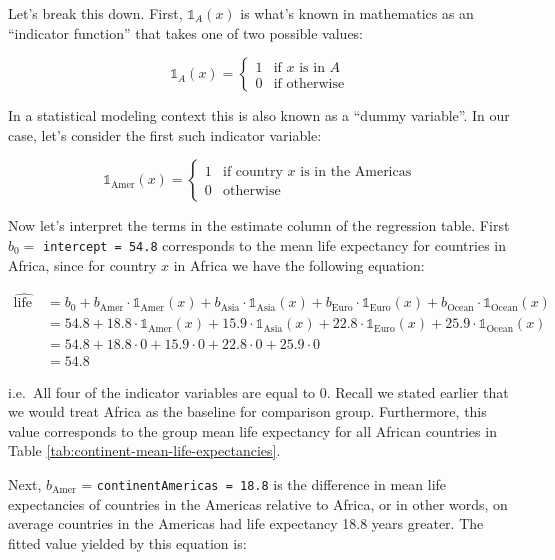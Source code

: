 \documentclass[12pt,]{krantz}
\theoremstyle{definition}
\theoremstyle{definition}
\theoremstyle{definition}
\theoremstyle{remark}
\begin{document}
Let's break this down. First, \(\mathbb{1}_{A}(x)\) is what's known in
mathematics as an ``indicator function'' that takes one of two possible
values:

\[
\mathbb{1}_{A}(x) = \left\{
\begin{array}{ll}
1 & \text{if } x \text{ is in } A \\
0 & \text{if } \text{otherwise} \end{array}
\right.
\]

In a statistical modeling context this is also known as a ``dummy
variable''. In our case, let's consider the first such indicator
variable:

\[
\mathbb{1}_{\mbox{Amer}}(x) = \left\{
\begin{array}{ll}
1 & \text{if } \text{country } x \text{ is in the Americas} \\
0 & \text{otherwise}\end{array}
\right.
\]

Now let's interpret the terms in the estimate column of the regression
table. First \(b_0 =\) \texttt{intercept\ =\ 54.8} corresponds to the
mean life expectancy for countries in Africa, since for country \(x\) in
Africa we have the following equation:

\begin{align}
\widehat{\text{life exp}} &= b_0 + b_{\text{Amer}}\cdot\mathbb{1}_{\mbox{Amer}}(x) + b_{\text{Asia}}\cdot\mathbb{1}_{\mbox{Asia}}(x)
+ b_{\text{Euro}}\cdot\mathbb{1}_{\mbox{Euro}}(x) + b_{\text{Ocean}}\cdot\mathbb{1}_{\mbox{Ocean}}(x)\\
&= 54.8 + 18.8\cdot\mathbb{1}_{\mbox{Amer}}(x) + 15.9\cdot\mathbb{1}_{\mbox{Asia}}(x)
+ 22.8\cdot\mathbb{1}_{\mbox{Euro}}(x) + 25.9\cdot\mathbb{1}_{\mbox{Ocean}}(x)\\
&= 54.8 + 18.8\cdot 0 + 15.9\cdot 0 + 22.8\cdot 0 + 25.9\cdot 0\\
&= 54.8
\end{align}

i.e.~All four of the indicator variables are equal to 0. Recall we
stated earlier that we would treat Africa as the baseline for comparison
group. Furthermore, this value corresponds to the group mean life
expectancy for all African countries in Table
\ref{tab:continent-mean-life-expectancies}.

Next, \(b_{\text{Amer}}\) = \texttt{continentAmericas\ =\ 18.8} is the
difference in mean life expectancies of countries in the Americas
relative to Africa, or in other words, on average countries in the
Americas had life expectancy 18.8 years greater. The fitted value
yielded by this equation is:
\end{document}
